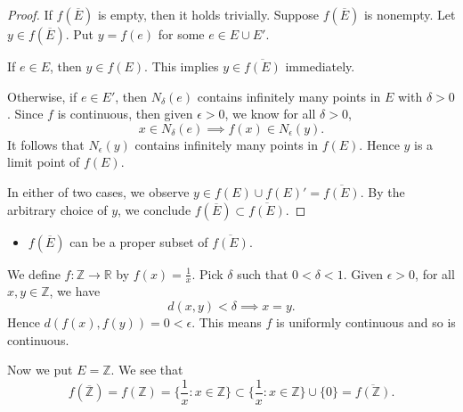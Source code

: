 \begin{Exercise}
\begin{proof}
If $f(\overline{E})$ is empty, then it holds trivially. Suppose $f(\overline{E})$ is nonempty. Let $y\in f(\overline{E})$. Put $y=f(e)$ for some $e\in E\cup E'$.

If $e\in E$, then $y\in f(E)$. This implies $y\in\overline{f(E)}$ immediately.

Otherwise, if $e\in E'$, then $N_{\delta}(e)$ contains infinitely many points in $E$ with $\delta>0$. Since $f$ is continuous, then given $\epsilon>0$, we know for all $\delta>0$,
$$
x\in N_{\delta}(e) \implies f(x)\in N_{\epsilon}(y).
$$
It follows that $N_{\epsilon}(y)$ contains infinitely many points in $f(E)$. Hence $y$ is a limit point of $f(E)$.

In either of two cases, we observe $y\in f(E)\cup f(E)' = \overline{f(E)}$. By the arbitrary choice of $y$, we conclude $f(\overline{E})\subset \overline{f(E)}$.
\end{proof}

\begin{itemize}
\item $f(\overline{E})$ can be a proper subset of $\overline{f(E)}$.
\end{itemize}
\begin{solution}
We define $f:\mathbb{Z}\to\mathbb{R}$ by $f(x) = \frac{1}{x}$. Pick $\delta$ such that $0 < \delta < 1$. Given $\epsilon>0$, for all $x,y\in \mathbb{Z}$, we have
$$
d(x,y)< \delta \implies x = y.
$$
Hence $d(f(x),f(y)) = 0 < \epsilon$. This means $f$ is uniformly continuous and so is continuous.

Now we put $E = \mathbb{Z}$. We see that
$$
f(\overline{\mathbb{Z}}) 
= f(\mathbb{Z}) 
= \{ \frac{1}{x} : x\in\mathbb{Z} \}
\subset \{ \frac{1}{x} : x\in\mathbb{Z} \} \cup \{0\}
= \overline{f(\mathbb{Z})}.
$$
\end{solution}
\end{Exercise}